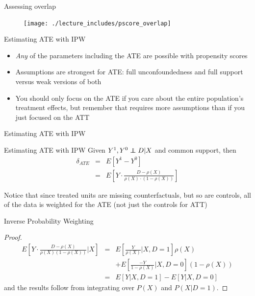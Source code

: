 \documentclass{beamer}
\newcommand\independent{\protect\mathpalette{\protect\independenT}{\perp}}
\def\independenT#1#2{\mathrel{\rlap{$#1#2$}\mkern2mu{#1#2}}}
\begin{document}
\begin{frame}{Assessing overlap}

\begin{figure}[!t]\centering
\texttt{[image: ./lecture\_includes/pscore\_overlap]}
\end{figure}

\end{frame}

\begin{frame}{Estimating ATE with IPW}

\begin{itemize}
\item \emph{Any} of the parameters including the ATE are possible with propensity scores

\item Assumptions are strongest for ATE:  full unconfoundedness and full support versus weak versions of both 

\item You should only focus on the ATE if you care about the entire population's treatment effects, but remember that requires more assumptions than if you just focused on the ATT

\end{itemize}

\end{frame}

	


\begin{frame}{Estimating ATE with IPW}

	
		\begin{block}{Estimating ATE with IPW}
	Given $Y^1,Y^0 \independent{D}|X$ and common support, then
		\begin{eqnarray*}
		\delta_{ATE}&=&E[Y^1-Y^0] \\
		&=&E \left[ Y \cdot  \frac{D - \rho(X)}{\rho(X) \cdot (1-\rho(X))} \right]
		\end{eqnarray*}
	\end{block}

Notice that since treated units are missing counterfactuals, but so are controls, all of the data is weighted for the ATE (not just the controls for ATT)

\end{frame}


\begin{frame}{Inverse Probability Weighting}

	\begin{proof}
	\begin{eqnarray*}
	E \left[ Y \cdot \frac{D-\rho(X)}{\rho(X)(1-\rho(X))} \Big\vert X \right] &=& E \left[ \frac{Y}{\rho(X)} \Big\vert X,D=1 \right] \rho(X) \\
	&& + E\left[ \frac{-Y}{1-\rho(X)} \Big\vert X,D=0 \right](1-\rho(X)) \\
	&=& E[Y|X,D=1] - E[Y|X,D=0]
	\end{eqnarray*}and the results follow from integrating over $P(X)$ and $P(X|D=1)$.
	\end{proof}

\end{frame}
\end{document}
